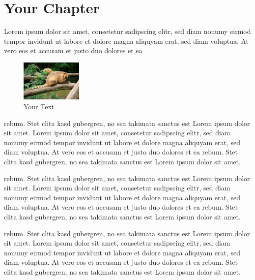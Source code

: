 \documentclass[a4paper]{scrreprt}
\begin{document}
\chapter{Your Chapter}
Lorem ipsum dolor sit amet, consetetur sadipscing elitr, sed diam 
nonumy eirmod tempor invidunt ut labore et dolore magna aliquyam 
erat, sed diam voluptua. At vero eos et accusam et justo duo dolores 
et ea 
\begin{figure}
  \vspace{-20pt}
  \begin{center}
    \includegraphics*[width=3cm]{YourImage.jpg} 
  \end{center}
  \vspace{-20pt}
  \caption{Your Text}
  \label{fig:bla}
  \vspace{-10pt}
\end{figure}
rebum. Stet clita kasd gubergren, no sea takimata sanctus est Lorem 
ipsum dolor sit amet. Lorem ipsum dolor sit amet, consetetur 
sadipscing elitr, sed diam nonumy eirmod tempor invidunt ut labore et
dolore magna aliquyam erat, sed diam voluptua. At vero eos et accusam
et justo duo dolores et ea rebum. Stet clita kasd gubergren, no sea 
takimata sanctus est Lorem ipsum dolor sit amet.

rebum. Stet clita kasd gubergren, no sea takimata sanctus est Lorem 
ipsum dolor sit amet. Lorem ipsum dolor sit amet, consetetur 
sadipscing elitr, sed diam nonumy eirmod tempor invidunt ut labore et
dolore magna aliquyam erat, sed diam voluptua. At vero eos et accusam
et justo duo dolores et ea rebum. Stet clita kasd gubergren, no sea 
takimata sanctus est Lorem ipsum dolor sit amet.

rebum. Stet clita kasd gubergren, no sea takimata sanctus est Lorem 
ipsum dolor sit amet. Lorem ipsum dolor sit amet, consetetur 
sadipscing elitr, sed diam nonumy eirmod tempor invidunt ut labore et
dolore magna aliquyam erat, sed diam voluptua. At vero eos et accusam
et justo duo dolores et ea rebum. Stet clita kasd gubergren, no sea 
takimata sanctus est Lorem ipsum dolor sit amet.
\end{document}
